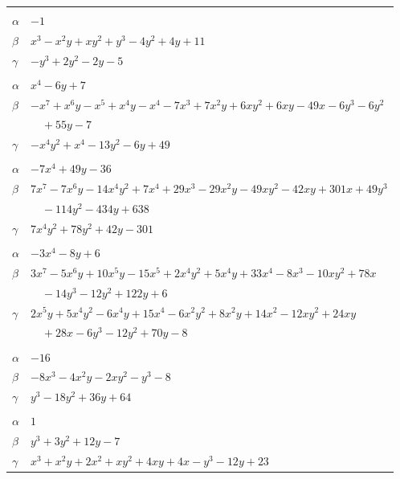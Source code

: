 \documentclass[11pt]{article}
\begin{document}
\begin{longtable}{@{}ll@{}}
\addlinespace[3pt]
\multicolumn{2}{@{}l}{$\{i,j\}=\{5,18\}$, $k_{ij}=2\cdot 3$}\\
$\alpha$ & $-1$\\
$\beta$ & $x^{3}-x^{2}y+xy^{2}+y^{3}-4y^{2}+4y+11$\\
$\gamma$ & $-y^{3}+2y^{2}-2y-5$\\
\addlinespace[3pt]
\multicolumn{2}{@{}l}{$\{i,j\}=\{5,23\}$, $k_{ij}=2\cdot 3\cdot 7$}\\
$\alpha$ & $x^{4}-6y+7$\\
$\beta$ & $-x^{7}+x^{6}y-x^{5}+x^{4}y-x^{4}-7x^{3}+7x^{2}y+6xy^{2}+6xy-49x-6y^{3}-6y^{2}$\\
 & $\quad +55y-7$\\
$\gamma$ & $-x^{4}y^{2}+x^{4}-13y^{2}-6y+49$\\
\addlinespace[3pt]
\multicolumn{2}{@{}l}{$\{i,j\}=\{5,32\}$, $k_{ij}=2^{2}\cdot 3^{2}$}\\
$\alpha$ & $-7x^{4}+49y-36$\\
$\beta$ & $7x^{7}-7x^{6}y-14x^{4}y^{2}+7x^{4}+29x^{3}-29x^{2}y-49xy^{2}-42xy+301x+49y^{3}$\\
 & $\quad -114y^{2}-434y+638$\\
$\gamma$ & $7x^{4}y^{2}+78y^{2}+42y-301$\\
\addlinespace[3pt]
\multicolumn{2}{@{}l}{$\{i,j\}=\{5,33\}$, $k_{ij}=2$}\\
$\alpha$ & $-3x^{4}-8y+6$\\
$\beta$ & $3x^{7}-5x^{6}y+10x^{5}y-15x^{5}+2x^{4}y^{2}+5x^{4}y+33x^{4}-8x^{3}-10xy^{2}+78x$\\
 & $\quad -14y^{3}-12y^{2}+122y+6$\\
$\gamma$ & $2x^{5}y+5x^{4}y^{2}-6x^{4}y+15x^{4}-6x^{2}y^{2}+8x^{2}y+14x^{2}-12xy^{2}+24xy$\\
 & $\quad +28x-6y^{3}-12y^{2}+70y-8$\\
\addlinespace[3pt]
\multicolumn{2}{@{}l}{$\{i,j\}=\{6,9\}$, $k_{ij}=2^{4}\cdot 3^{2}$}\\
$\alpha$ & $-16$\\
$\beta$ & $-8x^{3}-4x^{2}y-2xy^{2}-y^{3}-8$\\
$\gamma$ & $y^{3}-18y^{2}+36y+64$\\
\addlinespace[3pt]
\multicolumn{2}{@{}l}{$\{i,j\}=\{6,15\}$, $k_{ij}=3^{2}\cdot 5$}\\
$\alpha$ & $1$\\
$\beta$ & $y^{3}+3y^{2}+12y-7$\\
$\gamma$ & $x^{3}+x^{2}y+2x^{2}+xy^{2}+4xy+4x-y^{3}-12y+23$\\

\end{longtable}
\end{document}
